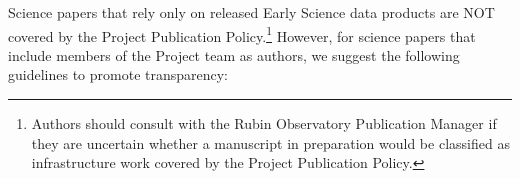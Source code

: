 \documentclass[SE,authoryear,toc,lsstdraft]{lsstdoc}
\begin{document}
Science papers that rely only on released Early Science data products are NOT covered by the Project Publication Policy.\footnote{Authors should consult with the Rubin Observatory Publication Manager if they are uncertain whether a manuscript in preparation would be classified as infrastructure work covered by the Project Publication Policy.}
However, for science papers that include members of the Project team as authors, we suggest the following guidelines to promote transparency:

\end{document}
